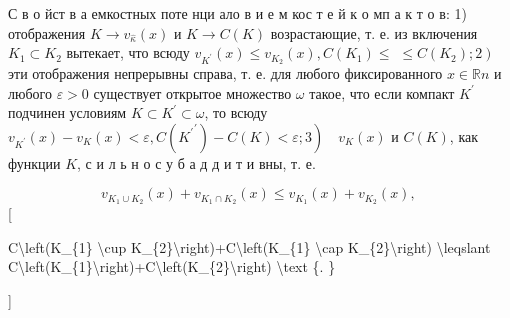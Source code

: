\documentclass[10pt]{article}
\begin{document}
С в о йст в а емкостных поте нци ало в и е м кос т е й к о мп а к т о в: 1) отображения $K \rightarrow v_{\hat{\kappa}}(x)$ и $K \rightarrow C(K)$ возрастающие, т. е. из включения $K_{1} \subset K_{2}$ вытекает, что всюду $v_{K^{\prime}}(x) \leqslant v_{K_{2}}(x), C\left(K_{1}\right) \leqslant$ $\left.\leqslant C\left(K_{2}\right) ; 2\right)$ эти отображения непрерывны справа, т. е. для любого фиксированного $x \in \mathbb{R} n$ и любого $\varepsilon>0$ существует открытое множество $\omega$ такое, что если компакт $K^{\prime}$ подчинен условиям $K \subset K^{\prime} \subset \omega$, то всюду $\left.v_{K^{\prime}}(x)-v_{K}(x)<\varepsilon, C\left({K^{\prime}}^{\prime}\right)-C(K)<\varepsilon ; 3\right) \quad v_{K}(x)$ и $C(K)$, как функции $K$, с и л ь н о с у б а д д и т и вны, т. е.



\[

v_{K_{1} \cup K_{2}}(x)+v_{K_{1} \cap K_{2}}(x) \leqslant v_{K_{1}}(x)+v_{K_{2}}(x) \text {, }

\][



C\textbackslash left(K\_\{1\} \textbackslash cup K\_\{2\}\textbackslash right)+C\textbackslash left(K\_\{1\} \textbackslash cap K\_\{2\}\textbackslash right) \textbackslash leqslant C\textbackslash left(K\_\{1\}\textbackslash right)+C\textbackslash left(K\_\{2\}\textbackslash right) \textbackslash text \{. \}

]
\end{document}
